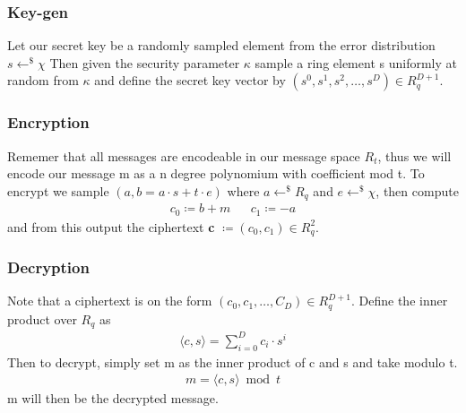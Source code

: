 \documentclass[../main.tex]{subfiles}
\begin{document}
    \subsubsection{Key-gen}
    Let our secret key be a randomly sampled element from the error distribution $s \leftarrow^\$ \chi$
    Then given the security parameter $\kappa$ sample a ring element s uniformly at random from $\kappa$ and define the
    secret key vector by $(s^0, s^1, s^2, \dots, s^D) \in R_q^{D+1}$.

    \subsubsection{Encryption}
    Rememer that all messages are encodeable in our message space $R_t$, thus we will encode our message m as a n degree
    polynomium with coefficient mod t.
    To encrypt we sample $(a, b = a \cdot s + t \cdot e)$ where $a \leftarrow^\$ R_q$ and $e \leftarrow^\$ \chi$,
    then compute
    \begin{align*}
        c_0 \coloneqq b + m && c_1 \coloneqq -a
    \end{align*}
    and from this output the ciphertext \textbf{c} $\coloneqq (c_0, c_1) \in R_q^2$.

    \subsubsection{Decryption}
    Note that a ciphertext is on the form $(c_0, c_1, \dots , C_{D}) \in R_q^{D+1}$.
    Define the inner product over $R_q$ as
    \begin{align*}
        \langle c, s \rangle = \sum_{i=0}^{D} c_i \cdot s^i
    \end{align*}
    Then to decrypt, simply set m as the inner product of c and s and take modulo t.
    \begin{align*}
        m = \langle c, s \rangle \bmod t
    \end{align*}
    m will then be the decrypted message.
\end{document}
